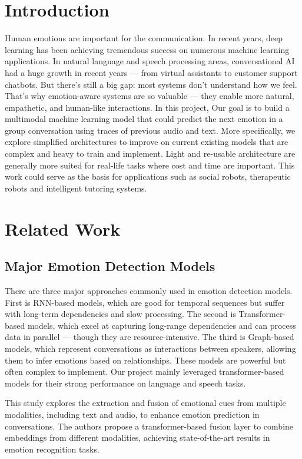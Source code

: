 \documentclass{article}
\begin{document}
\section{Introduction}
Human emotions are important for the  communication. In recent years, deep learning has been achieving tremendous success on numerous machine learning
applications. In natural language and speech processing areas, conversational AI had a huge growth in recent years — from virtual assistants to customer support chatbots. But there’s still a big gap: most systems don’t understand how we feel.
That’s why emotion-aware systems are so valuable — they enable more natural, empathetic, and human-like interactions. In this project, Our goal is to  build a multimodal machine learning model that could predict the next emotion in a group conversation using traces of previous audio and text. More specifically, we explore simplified architectures to improve on current existing models that are complex and heavy to train and implement. Light and re-usable architecture are generally more suited for real-life tasks where cost and time are important. This work could serve as the basis for applications such as social robots, therapeutic robots and intelligent tutoring systems. 

\section{Related Work}
\subsection{Major Emotion Detection Models}
There are three major approaches commonly used in emotion detection models.
First is RNN-based models, which are good for temporal sequences but suffer with long-term dependencies and slow processing. 
The second is Transformer-based models, which excel at capturing long-range dependencies and can process data in parallel — though they are resource-intensive.
The third is Graph-based models, which represent conversations as interactions between speakers, allowing them to infer emotions based on relationships. These models are powerful but often complex to implement.
Our project mainly leveraged transformer-based models for their strong performance on language and speech tasks.

 This study \cite{ERCFusionModel} explores the extraction and fusion of emotional cues from multiple modalities, including text and audio, to enhance emotion prediction in conversations. The authors propose a transformer-based fusion layer to combine embeddings from different modalities, achieving state-of-the-art results in emotion recognition tasks.
 
\end{document}
